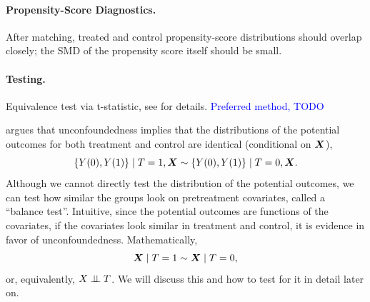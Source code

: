 \documentclass[11pt]{exam}
\begin{document}
\paragraph{Propensity-Score Diagnostics.}
After matching, treated and control propensity-score distributions should overlap
closely; the SMD of the propensity score itself should be small.

\paragraph{Testing.} Equivalence test via t-statistic, see \citet{hartman2018equivalence} for details.
\textcolor{blue}{Preferred method, TODO}

\cite{hartman2018equivalence} argues that unconfoundedness implies that the distributions of the potential outcomes for both treatment and control are identical (conditional on $\bm{X}$),
\[
 \{Y(0), Y(1)\} \mid T=1, \bm{X} \sim  \{Y(0), Y(1)\} \mid T=0, \bm{X}.
\]
Although we cannot directly test the distribution of the potential outcomes,
we can test how similar the groups look on pretreatment
covariates, called a “balance test”. Intuitive, since the potential outcomes are functions of the covariates, if the covariates look similar in treatment and control, it is evidence in favor of unconfoundedness. Mathematically, 
\[
    \bm{X} \mid T = 1 \sim \bm{X} \mid T = 0,
\]
or, equivalently, $X \perp\!\!\!\perp T$. We will discuss this and how to test for it in detail later on.
\end{document}
